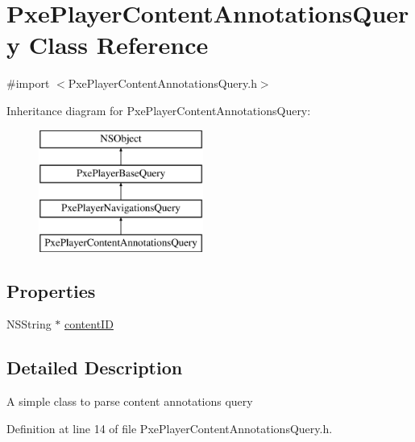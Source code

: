 \hypertarget{interface_pxe_player_content_annotations_query}{\section{Pxe\-Player\-Content\-Annotations\-Query Class Reference}
\label{interface_pxe_player_content_annotations_query}
}


{\ttfamily \#import $<$Pxe\-Player\-Content\-Annotations\-Query.\-h$>$}

Inheritance diagram for Pxe\-Player\-Content\-Annotations\-Query\-:\begin{figure}[H]
\begin{center}
\leavevmode
\includegraphics[height=4.000000cm]{interface_pxe_player_content_annotations_query}
\end{center}
\end{figure}
\subsection*{Properties}
\begin{DoxyCompactItemize}
\item 
N\-S\-String $\ast$ \hyperlink{interface_pxe_player_content_annotations_query_af5d3e270914a79ec43e134e2fa6c5627}{content\-I\-D}
\end{DoxyCompactItemize}


\subsection{Detailed Description}
A simple class to parse content annotations query 

Definition at line 14 of file Pxe\-Player\-Content\-Annotations\-Query.\-h.



